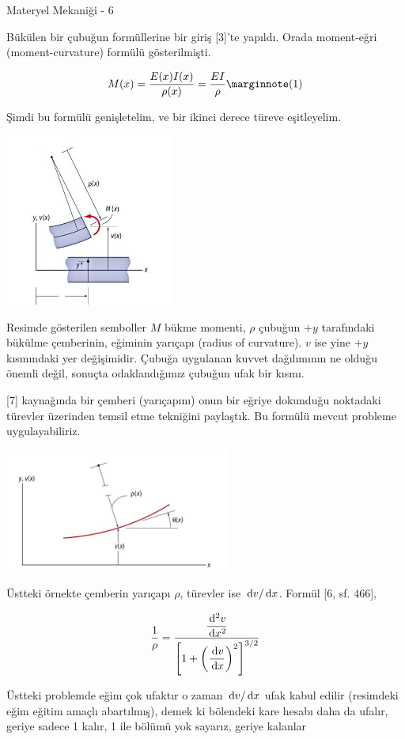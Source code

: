 \documentclass[12pt,fleqn]{article}\usepackage{../../common}
\begin{document}
Materyel Mekaniği - 6

Bükülen bir çubuğun formüllerine bir giriş [3]'te yapıldı. Orada moment-eğri
(moment-curvature) formülü gösterilmişti.

$$
M(x) = \frac{E(x)I(x)}{\rho(x)} = \frac{EI}{\rho}
\mlabel{1}
$$

Şimdi bu formülü genişletelim, ve bir ikinci derece türeve eşitleyelim.

\includegraphics[width=15em]{phy_020_strs_05_01.jpg}

Resimde gösterilen semboller $M$ bükme momenti, $\rho$ çubuğun $+y$ tarafındaki
bükülme çemberinin, eğiminin yarıçapı (radius of curvature).  $v$ ise yine $+y$
kısmındaki yer değişimidir. Çubuğa uygulanan kuvvet dağılımının ne olduğu
önemli değil, sonuçta odaklandığımız çubuğun ufak bir kısmı.

[7] kaynağında bir çemberi (yarıçapını) onun bir eğriye dokunduğu noktadaki
türevler üzerinden temsil etme tekniğini paylaştık. Bu formülü mevcut probleme
uygulayabiliriz.

\includegraphics[width=20em]{phy_020_strs_05_02.jpg}

Üstteki örnekte çemberin yarıçapı $\rho$, türevler ise $\,\mathrm{d} v / \,\mathrm{d} x$.
Formül [6, sf. 466],

$$
\frac{1}{\rho} =
\frac
{\dfrac{\,\mathrm{d}^2 v}{\,\mathrm{d} x^2}}
{ \left[ 1 + \left( \dfrac{\,\mathrm{d} v}{\,\mathrm{d} x}  \right)^2 \right]^{3/2} }
$$

Üstteki problemde eğim çok ufaktır o zaman $\,\mathrm{d} v / \,\mathrm{d} x$ ufak kabul edilir
(resimdeki eğim eğitim amaçlı abartılmış), demek ki bölendeki kare hesabı
daha da ufalır, geriye sadece 1 kalır, 1 ile bölümü yok sayarız, geriye kalanlar
\end{document}
